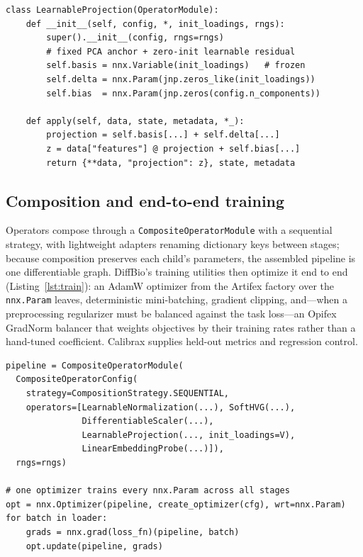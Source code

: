 \documentclass[10pt,twocolumn]{article}
\begin{document}
\begin{lstlisting}[caption={The uniform operator interface: a learnable projection.},label={lst:operator},float=t]
class LearnableProjection(OperatorModule):
    def __init__(self, config, *, init_loadings, rngs):
        super().__init__(config, rngs=rngs)
        # fixed PCA anchor + zero-init learnable residual
        self.basis = nnx.Variable(init_loadings)   # frozen
        self.delta = nnx.Param(jnp.zeros_like(init_loadings))
        self.bias  = nnx.Param(jnp.zeros(config.n_components))

    def apply(self, data, state, metadata, *_):
        projection = self.basis[...] + self.delta[...]
        z = data["features"] @ projection + self.bias[...]
        return {**data, "projection": z}, state, metadata
\end{lstlisting}

\subsection{Composition and end-to-end training}

Operators compose through a \texttt{CompositeOperatorModule} with a sequential strategy,
with lightweight adapters renaming dictionary keys between stages; because composition
preserves each child's parameters, the assembled pipeline is one differentiable graph.
DiffBio's training utilities then optimize it end to end (Listing~\ref{lst:train}): an AdamW
optimizer from the Artifex factory over the \texttt{nnx.Param} leaves, deterministic
mini-batching, gradient clipping, and---when a preprocessing regularizer must be balanced
against the task loss---an Opifex GradNorm balancer that weights objectives by their
training rates rather than a hand-tuned coefficient. Calibrax supplies held-out metrics and
regression control.

\begin{lstlisting}[caption={Composing operators into a pipeline and training every stage's parameters end to end.},label={lst:train},float=t]
pipeline = CompositeOperatorModule(
  CompositeOperatorConfig(
    strategy=CompositionStrategy.SEQUENTIAL,
    operators=[LearnableNormalization(...), SoftHVG(...),
               DifferentiableScaler(...),
               LearnableProjection(..., init_loadings=V),
               LinearEmbeddingProbe(...)]),
  rngs=rngs)

# one optimizer trains every nnx.Param across all stages
opt = nnx.Optimizer(pipeline, create_optimizer(cfg), wrt=nnx.Param)
for batch in loader:
    grads = nnx.grad(loss_fn)(pipeline, batch)
    opt.update(pipeline, grads)
\end{lstlisting}
\end{document}
